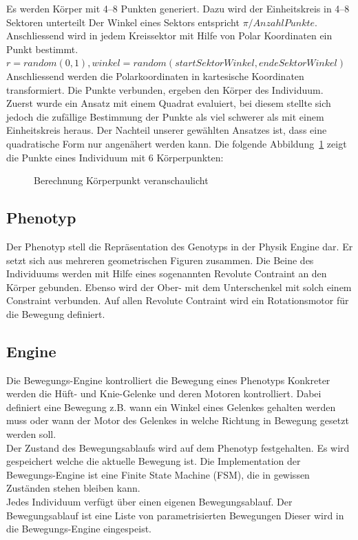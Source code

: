         Es werden Körper mit 4--8 Punkten generiert. Dazu wird der Einheitskreis in 4--8 Sektoren unterteilt
        Der Winkel eines Sektors entspricht \(\pi / Anzahl Punkte\).
        \\
        Anschliessend wird in jedem Kreissektor mit Hilfe von Polar Koordinaten ein Punkt bestimmt.
        \\
        \( r = random (0, 1), winkel = random(startSektorWinkel, endeSektorWinkel ) \)
        Anschliessend werden die Polarkoordinaten in kartesische Koordinaten transformiert.
        Die Punkte verbunden, ergeben den Körper des Individuum.
        \\
        Zuerst wurde ein Ansatz mit einem Quadrat evaluiert, bei diesem stellte sich jedoch die zufällige Bestimmung
        der Punkte als viel schwerer als mit einem Einheitskreis heraus. Der Nachteil unserer gewählten
        Ansatzes ist, dass eine quadratische Form nur angenähert werden kann.
        Die folgende Abbildung~\ref{fig:kp} zeigt die Punkte eines Individuum mit 6 Körperpunkten:
        \\
        \begin{figure}[H]
          
          \caption{Berechnung Körperpunkt veranschaulicht\label{fig:kp}}
        \end{figure}

  \subsection{Phenotyp\label{sub:Phenotyp}}

    Der Phenotyp stell die Repräsentation des Genotyps in der Physik Engine dar.
    Er setzt sich aus mehreren geometrischen Figuren zusammen. Die Beine des Individuums
    werden mit Hilfe eines sogenannten Revolute Contraint an den Körper gebunden.
    Ebenso wird der Ober- mit dem Unterschenkel mit solch einem Constraint verbunden.
    Auf allen Revolute Contraint wird ein Rotationsmotor für die Bewegung definiert.

  \subsection{Engine\label{sub:Engine}}

    Die Bewegungs-Engine kontrolliert die Bewegung eines Phenotyps
    Konkreter werden die Hüft- und Knie-Gelenke und deren Motoren kontrolliert.
    Dabei definiert eine Bewegung z.B. wann ein Winkel eines Gelenkes gehalten werden muss
    oder wann der Motor des Gelenkes in welche Richtung in Bewegung gesetzt werden soll.
    \\
    Der Zustand des Bewegungsablaufs wird auf dem Phenotyp festgehalten.
    Es wird gespeichert welche die aktuelle Bewegung ist.
    Die Implementation der Bewegungs-Engine ist eine Finite State Machine (FSM),
    die in gewissen Zuständen stehen bleiben kann.
    \\
    Jedes Individuum verfügt über einen eigenen Bewegungsablauf.
    Der Bewegungsablauf ist eine Liste von parametrisierten Bewegungen
    Dieser wird in die Bewegungs-Engine eingespeist.


